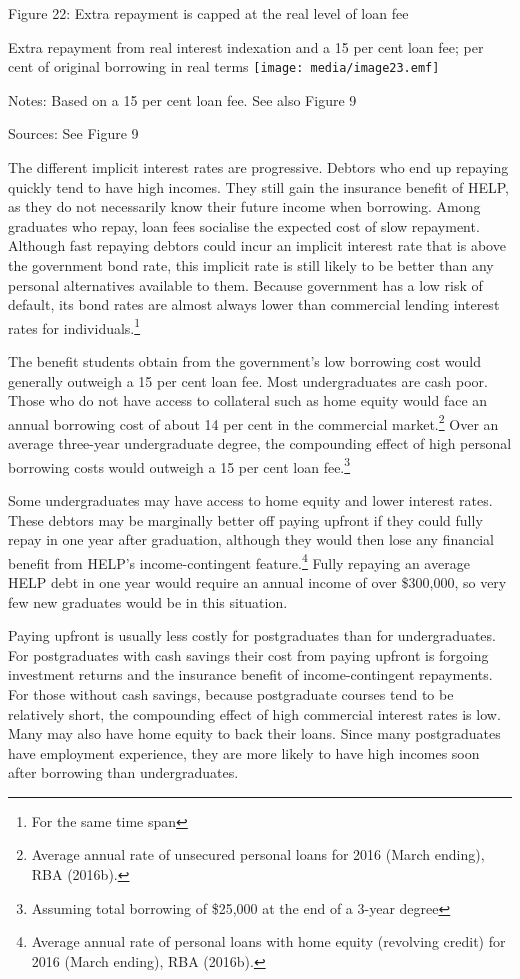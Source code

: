 \documentclass[]{book}
\begin{document}
\protect\hypertarget{_Ref324072138}{}{\protect\hypertarget{_Ref324086631}{}{}}Figure 22: Extra repayment is capped at the real level of loan fee

Extra repayment from real interest indexation and a 15 per cent loan fee; per cent of original borrowing in real terms \texttt{[image: media/image23.emf]}

Notes: Based on a 15 per cent loan fee. See also Figure 9

Sources: See Figure 9

The different implicit interest rates are progressive. Debtors who end up repaying quickly tend to have high incomes. They still gain the insurance benefit of HELP, as they do not necessarily know their future income when borrowing. Among graduates who repay, loan fees socialise the expected cost of slow repayment. Although fast repaying debtors could incur an implicit interest rate that is above the government bond rate, this implicit rate is still likely to be better than any personal alternatives available to them. Because government has a low risk of default, its bond rates are almost always lower than commercial lending interest rates for individuals.\footnote{For the same time span}

The benefit students obtain from the government's low borrowing cost would generally outweigh a 15 per cent loan fee. Most undergraduates are cash poor. Those who do not have access to collateral such as home equity would face an annual borrowing cost of about 14 per cent in the commercial market.\footnote{Average annual rate of unsecured personal loans for 2016 (March ending), RBA (2016b).} Over an average three-year undergraduate degree, the compounding effect of high personal borrowing costs would outweigh a 15 per cent loan fee.\footnote{Assuming total borrowing of \$25,000 at the end of a 3-year degree}

Some undergraduates may have access to home equity and lower interest rates. These debtors may be marginally better off paying upfront if they could fully repay in one year after graduation, although they would then lose any financial benefit from HELP's income-contingent feature.\footnote{Average annual rate of personal loans with home equity (revolving credit) for 2016 (March ending), RBA (2016b).} Fully repaying an average HELP debt in one year would require an annual income of over \$300,000, so very few new graduates would be in this situation.

Paying upfront is usually less costly for postgraduates than for undergraduates. For postgraduates with cash savings their cost from paying upfront is forgoing investment returns and the insurance benefit of income-contingent repayments. For those without cash savings, because postgraduate courses tend to be relatively short, the compounding effect of high commercial interest rates is low. Many may also have home equity to back their loans. Since many postgraduates have employment experience, they are more likely to have high incomes soon after borrowing than undergraduates.
\end{document}
